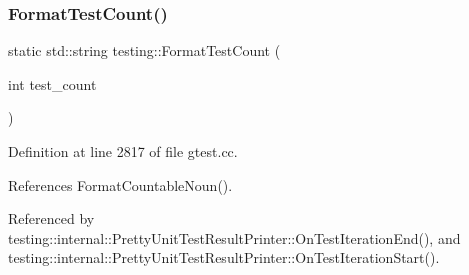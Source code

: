 \subsubsection{\texorpdfstring{Format\+Test\+Count()}{FormatTestCount()}}
{\footnotesize\ttfamily static std\+::string testing\+::\+Format\+Test\+Count (\begin{DoxyParamCaption}\item[{int}]{test\+\_\+count }\end{DoxyParamCaption})\hspace{0.3cm}{\ttfamily [static]}}



Definition at line 2817 of file gtest.\+cc.



References Format\+Countable\+Noun().



Referenced by testing\+::internal\+::\+Pretty\+Unit\+Test\+Result\+Printer\+::\+On\+Test\+Iteration\+End(), and testing\+::internal\+::\+Pretty\+Unit\+Test\+Result\+Printer\+::\+On\+Test\+Iteration\+Start().


